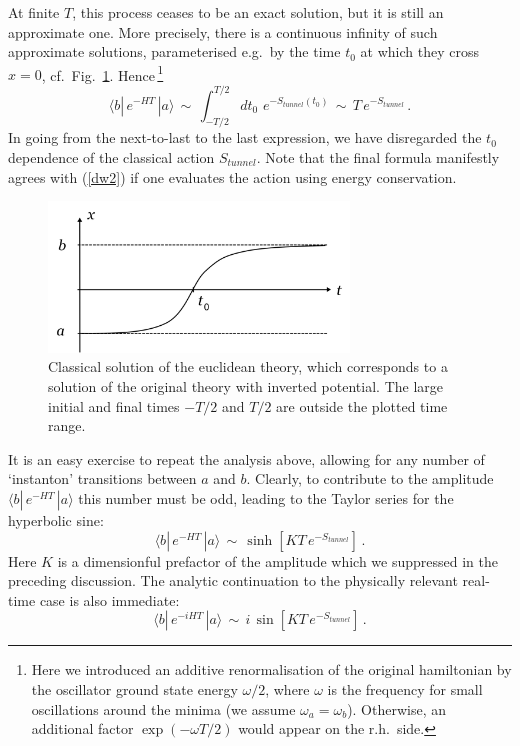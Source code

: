 \documentclass[12pt]{article}
\newcommand{\be}{\begin{equation}}
\newcommand{\ee}{\end{equation}}
\numberwithin{equation}{section}
\begin{document}
At finite $T$, this process ceases to be an exact solution, but it is still an approximate one. More precisely, there is a continuous infinity of such approximate solutions, parameterised e.g.~by the time $t_0$ at which they cross $x=0$, cf.~Fig.~\ref{rolling}. Hence$\,$\footnote{
Here
we introduced an additive renormalisation of the original hamiltonian by the oscillator ground state energy $\omega/2$, where $\omega$ is the frequency for small oscillations around the minima (we assume $\omega_a=\omega_b$). Otherwise, an additional factor $\exp(-\omega T/2)$ would appear on the r.h.~side.
}
\be
\langle b|\,e^{-HT}\,|a\rangle \,\sim\,\int_{-T/2}^{T/2}dt_0\,\,e^{-S_{tunnel}(t_0)}\,\sim\, T\,e^{-S_{tunnel}}\,.
\ee
In going from the next-to-last to the last expression, we have disregarded the $t_0$ dependence of the classical action $S_{tunnel}$. Note that the final formula manifestly agrees with (\ref{dw2}) if one evaluates the action using energy conservation.

\begin{figure}[ht]
\begin{center} 
\includegraphics[width=8cm]{rolling.png}
\caption{Classical solution of the euclidean theory, which corresponds to a solution of the original theory with inverted potential. The large initial and final times $-T/2$ and $T/2$ are outside the plotted time range.}
\label{rolling} 
\end{center}
\end{figure}

It is an easy exercise to repeat the analysis above, allowing for any number of `instanton' transitions between $a$ and $b$. Clearly, to contribute to the amplitude $\langle b|\,e^{-HT}\,|a\rangle$ this number must be odd, leading to the Taylor series for the hyperbolic sine:
\be
\langle b|\,e^{-HT}\,|a\rangle \,\sim\,\sinh\left[KT\,e^{-S_{tunnel}}\right]\,.
\ee
Here $K$ is a dimensionful prefactor of the amplitude which we suppressed in the preceding discussion. The analytic continuation to the physically relevant real-time case is also immediate:
\be
\langle b|\,e^{-iHT}\,|a\rangle \,\sim\,i\,\sin\left[KT\,e^{-S_{tunnel}}\right]\,.
\ee
\end{document}
